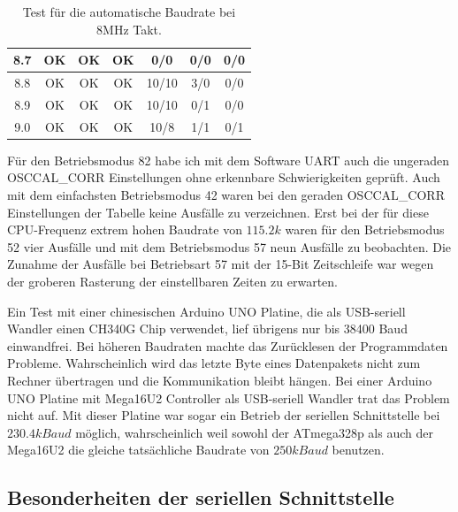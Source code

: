 \begin{table}[H]
\begin{center}
\begin{tabular}{| c | c || c | c || c | c | c |}
    8.7   &  OK     &   OK     &   OK    &  0/0    &  0/0    &   0/0 \\
    \hline
    8.8   &  OK     &   OK     &   OK    &  10/10  &  3/0    &   0/0 \\
    8.9   &  OK     &   OK     &   OK    &  10/10  &  0/1    &   0/0 \\
    9.0   &  OK     &   OK     &   OK    &  10/8   &  1/1    &   0/1 \\
    \hline
    \end{tabular}
  \end{center}
  \caption{Test für die automatische Baudrate bei 8MHz Takt.}
  \label{tab:AutoBaudTest8}
\end{table}


Für den Betriebsmodus 82 habe ich mit dem Software UART
auch die ungeraden OSCCAL\_CORR Einstellungen ohne erkennbare Schwierigkeiten geprüft.
Auch mit dem einfachsten Betriebsmodus 42 waren bei den geraden OSCCAL\_CORR
Einstellungen der Tabelle keine Ausfälle zu verzeichnen.
Erst bei der für diese CPU-Frequenz extrem hohen Baudrate von \(115.2k\) waren 
für den Betriebsmodus 52 vier Ausfälle und mit dem Betriebsmodus 57 neun Ausfälle
zu beobachten. Die Zunahme der Ausfälle bei Betriebsart 57 mit der 15-Bit Zeitschleife war
wegen der groberen Rasterung der einstellbaren Zeiten zu erwarten.

Ein Test mit einer chinesischen Arduino UNO Platine, die als USB-seriell Wandler einen
CH340G Chip verwendet, lief übrigens nur bis 38400 Baud einwandfrei.
Bei höheren Baudraten machte das Zurücklesen der Programmdaten Probleme.
Wahrscheinlich wird das letzte Byte eines Datenpakets nicht zum Rechner übertragen und
die Kommunikation bleibt hängen. Bei einer Arduino UNO Platine mit Mega16U2 Controller
als USB-seriell Wandler trat das Problem nicht auf. Mit dieser Platine war sogar
ein Betrieb der seriellen Schnittstelle bei \(230.4kBaud\) möglich, wahrscheinlich
weil sowohl der ATmega328p als auch der Mega16U2 die gleiche tatsächliche Baudrate
von \(250kBaud\) benutzen.

\subsection{Besonderheiten der seriellen Schnittstelle}

